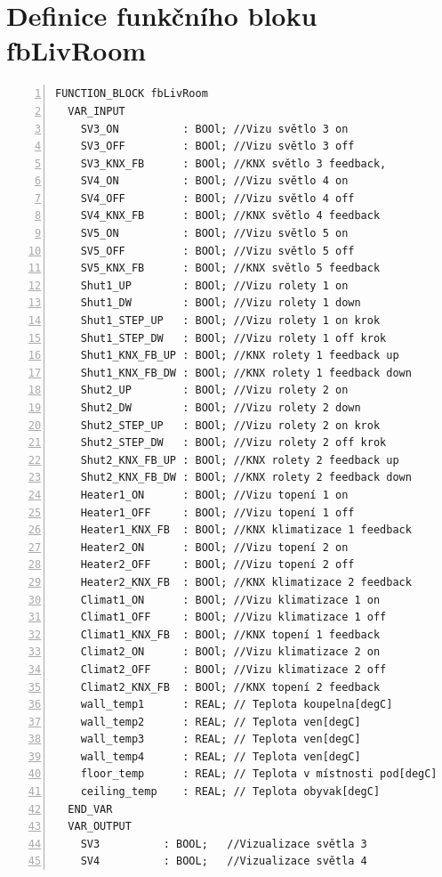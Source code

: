 \chapter{Definice funkčního bloku fbLivRoom}
\label{apend:fbLivRoom}
\begin{lstlisting}[language=ST, breaklines=true, numbers=left, numberstyle=\small, numbersep=10pt, frame=single, basicstyle=\ttfamily\small, caption={Definice funkčního bloku fbLivRoom}, label={lst:fbLivRoom}]
FUNCTION_BLOCK fbLivRoom
  VAR_INPUT
    SV3_ON          : BOOl; //Vizu světlo 3 on
    SV3_OFF         : BOOl; //Vizu světlo 3 off
    SV3_KNX_FB      : BOOl; //KNX světlo 3 feedback,
    SV4_ON          : BOOl; //Vizu světlo 4 on
    SV4_OFF         : BOOl; //Vizu světlo 4 off
    SV4_KNX_FB      : BOOl; //KNX světlo 4 feedback
    SV5_ON          : BOOl; //Vizu světlo 5 on
    SV5_OFF         : BOOl; //Vizu světlo 5 off
    SV5_KNX_FB      : BOOl; //KNX světlo 5 feedback
    Shut1_UP        : BOOl; //Vizu rolety 1 on
    Shut1_DW        : BOOl; //Vizu rolety 1 down
    Shut1_STEP_UP   : BOOl; //Vizu rolety 1 on krok
    Shut1_STEP_DW   : BOOl; //Vizu rolety 1 off krok
    Shut1_KNX_FB_UP : BOOl; //KNX rolety 1 feedback up
    Shut1_KNX_FB_DW : BOOl; //KNX rolety 1 feedback down
    Shut2_UP        : BOOl; //Vizu rolety 2 on
    Shut2_DW        : BOOl; //Vizu rolety 2 down
    Shut2_STEP_UP   : BOOl; //Vizu rolety 2 on krok
    Shut2_STEP_DW   : BOOl; //Vizu rolety 2 off krok
    Shut2_KNX_FB_UP : BOOl; //KNX rolety 2 feedback up
    Shut2_KNX_FB_DW : BOOl; //KNX rolety 2 feedback down
    Heater1_ON      : BOOl; //Vizu topení 1 on
    Heater1_OFF     : BOOl; //Vizu topení 1 off
    Heater1_KNX_FB  : BOOl; //KNX klimatizace 1 feedback
    Heater2_ON      : BOOl; //Vizu topení 2 on
    Heater2_OFF     : BOOl; //Vizu topení 2 off
    Heater2_KNX_FB  : BOOl; //KNX klimatizace 2 feedback
    Climat1_ON      : BOOl; //Vizu klimatizace 1 on
    Climat1_OFF     : BOOl; //Vizu klimatizace 1 off
    Climat1_KNX_FB  : BOOl; //KNX topení 1 feedback
    Climat2_ON      : BOOl; //Vizu klimatizace 2 on
    Climat2_OFF     : BOOl; //Vizu klimatizace 2 off
    Climat2_KNX_FB  : BOOl; //KNX topení 2 feedback
    wall_temp1      : REAL; // Teplota koupelna[degC]
    wall_temp2      : REAL; // Teplota ven[degC]
    wall_temp3      : REAL; // Teplota ven[degC]
    wall_temp4      : REAL; // Teplota ven[degC]
    floor_temp      : REAL; // Teplota v místnosti pod[degC]
    ceiling_temp    : REAL; // Teplota obyvak[degC]
  END_VAR
  VAR_OUTPUT
    SV3          : BOOL;   //Vizualizace světla 3
    SV4          : BOOL;   //Vizualizace světla 4

\end{lstlisting}
